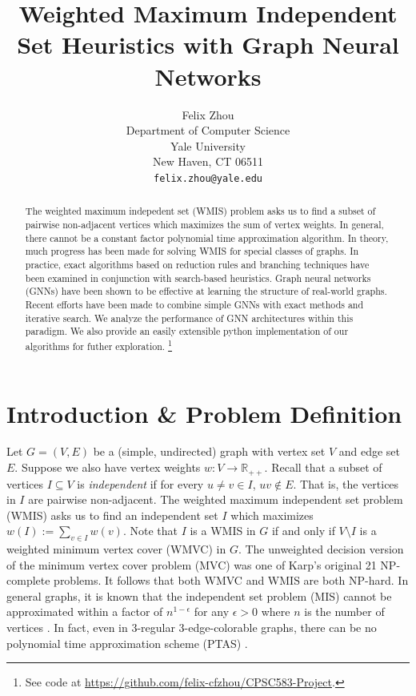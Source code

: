 \documentclass{article}
\title{Weighted Maximum Independent Set Heuristics with Graph Neural Networks}
\author{%
  Felix Zhou\\
  Department of Computer Science\\
  Yale University\\
  New Haven, CT 06511 \\
  \texttt{felix.zhou@yale.edu} \\
}
\newcommand{\R}{\mathbb{R}}
\newcommand{\sset}{\subseteq}
\begin{document}
\maketitle


\begin{abstract}
  The weighted maximum indepedent set (WMIS) problem asks us to find a subset of pairwise non-adjacent vertices
  which maximizes the sum of vertex weights.
  In general, there cannot be a constant factor polynomial time approximation algorithm.
  In theory, much progress has been made for solving WMIS for special classes of graphs.
  In practice, exact algorithms based on reduction rules and branching techniques have been examined
  in conjunction with search-based heuristics.
  Graph neural networks (GNNs) have been shown to be effective at learning the structure of real-world graphs.
  Recent efforts have been made to combine simple GNNs with exact methods and iterative search.
  We analyze the performance of GNN architectures within this paradigm.
  We also provide an easily extensible python implementation of our algorithms for futher exploration.
  \footnote{See code at \url{https://github.com/felix-cfzhou/CPSC583-Project}.}
\end{abstract}


\section{Introduction \& Problem Definition}
Let $G=(V, E)$ be a (simple, undirected) graph with vertex set $V$
and edge set $E$.
Suppose we also have vertex weights $w: V\to \R_{++}$.
Recall that a subset of vertices $I\sset V$ is \emph{independent}
if for every $u\neq v\in I$, $uv\notin E$.
That is, the vertices in $I$ are pairwise non-adjacent.
The weighted maximum independent set problem (WMIS)
asks us to find an independent set $I$ which maximizes $w(I) := \sum_{v\in I} w(v)$.
Note that $I$ is a WMIS in $G$
if and only if $V\setminus I$ is a weighted minimum vertex cover (WMVC) in $G$.
The unweighted decision version of the minimum vertex cover problem (MVC)
was one of Karp's original 21 NP-complete problems.
It follows that both WMVC and WMIS are both NP-hard.
In general graphs,
it is known that the independent set problem (MIS) cannot be approximated within a factor of $n^{1-\epsilon}$ for any $\epsilon > 0$ where $n$ is the number of vertices \citet{zuckerman2006linear}.
In fact, even in 3-regular 3-edge-colorable graphs,
there can be no polynomial time approximation scheme (PTAS) \citet{berman1999appr}.
\end{document}
